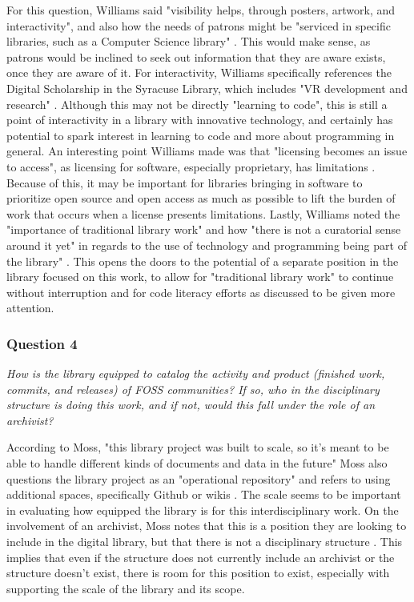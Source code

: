 For this question, Williams said "visibility helps, through posters, artwork, and interactivity", and also how the needs of patrons might be "serviced in specific libraries, such as a Computer Science library" \cite{patrickinterview}. This would make sense, as patrons would be inclined to seek out information that they are aware exists, once they are aware of it. For interactivity, Williams specifically references the Digital Scholarship in the Syracuse Library, which includes "VR development and research" \cite{patrickinterview}. Although this may not be directly "learning to code", this is still a point of interactivity in a library with innovative technology, and certainly has potential to spark interest in learning to code and more about programming in general. An interesting point Williams made was that "licensing becomes an issue to access", as licensing for software, especially proprietary, has limitations \cite{patrickinterview}. Because of this, it may be important for libraries bringing in software to prioritize open source and open access as much as possible to lift the burden of work that occurs when a license presents limitations. Lastly, Williams noted the "importance of traditional library work" and how "there is not a curatorial sense around it yet" in regards to the use of technology and programming being part of the library" \cite{patrickinterview}. This opens the doors to the potential of a separate position in the library focused on this work, to allow for "traditional library work" to continue without interruption and for code literacy efforts as discussed to be given more attention.  

\subsubsection{Question 4}

\textit{How is the library equipped to catalog the activity and product (finished work, commits, and releases) of FOSS communities? If so, who in the disciplinary structure is doing this work, and if not, would this fall under the role of an archivist?}
\hspace*{\fill}

According to Moss, "this library project was built to scale, so it's meant to be able to handle different kinds of documents and data in the future" Moss also questions the library project as an "operational repository" and refers to using additional spaces, specifically Github or wikis \cite{elaeinterview}. The scale seems to be important in evaluating how equipped the library is for this interdisciplinary work. On the involvement of an archivist, Moss notes that this is a position they are looking to include in the digital library, but that there is not a disciplinary structure \cite{elaeinterview}. This implies that even if the structure does not currently include an archivist or the structure doesn't exist, there is room for this position to exist, especially with supporting the scale of the library and its scope.

